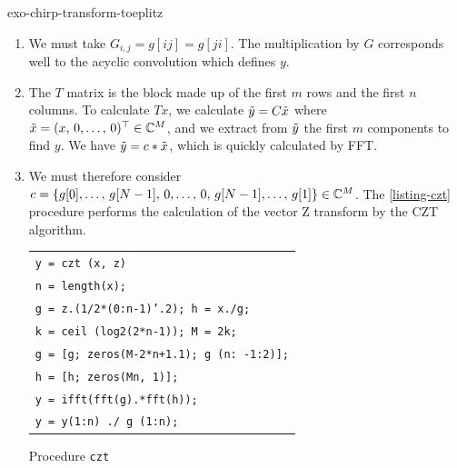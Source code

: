 
\begin{correction}{exo-chirp-transform-toeplitz}
\begin{enumerate}
\item {} We must take $ G_{i, j} = g [ij] = g [ji] $. The multiplication by $ G $ corresponds well to the acyclic convolution which defines $ y $.
\item The $ T $ matrix is the block made up of the first $ m $ rows and the first $ n $ columns. To calculate $ T x $, we calculate $ \tilde{y} = C \tilde{x} $ where $ \tilde{x} = (x, \, 0, \ldots, \, 0)^\top \in \mathbb{C}^M $, and we extract from $ \tilde{y} $ the first $ m $ components to find $ y $. We have $ \tilde{y} = c * \tilde{x} $, which is quickly calculated by FFT.
\item {}  We must therefore consider $ c = \{g [0], \ldots, \, g [N-1], \, 0, \ldots, \, 0 , \, g [N-1], \ldots, \, g [1]\} \in \mathbb{C}^M $. The \Matlab{} \ref{listing-czt} procedure performs the calculation of the vector Z transform by the CZT algorithm.

\begin{listing} 
\begin{footnotesize}
{\upshape
\begin{tabular}{l} \texttt{\pfunction y = czt (x, z)} \\
\texttt{n = length(x);} \\
\texttt{g = z.{\hatverb}(1/2*(0:n-1)'.{\hatverb}2); h = x./g;} \\
\texttt{k = ceil (log2(2*n-1)); M = 2{\hatverb}k;} \\
\texttt{g = [g; zeros(M-2*n+1.1); g (n: -1:2)];} \\
\texttt{h = [h; zeros(Mn, 1)];} \\
\texttt{y = ifft(fft(g).*fft(h));} \\
\texttt{y = y(1:n) ./ g (1:n);} \\
\end{tabular}
}
\end{footnotesize}
\caption{Procedure \texttt{\upshape czt}}
 \label{listing-czt}
\end{listing}
\end{enumerate}
\end{correction}
 
